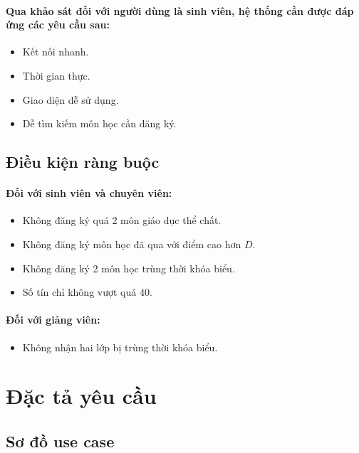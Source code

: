 \documentclass{article}
\begin{document}
    \paragraph{
      \textnormal{
        Qua khảo sát đối với người dùng là sinh viên, hệ thống cần được đáp ứng các yêu cầu sau:
      }
    }
    \begin{itemize}
      \item Kết nối nhanh.
      \item Thời gian thực.
      \item Giao diện dễ sử dụng.
      \item Dễ tìm kiếm môn học cần đăng ký.
    \end{itemize}
  
  \subsection{Điều kiện ràng buộc}
    \paragraph{Đối với sinh viên và chuyên viên:}
    \begin{itemize}
      \item Không đăng ký quá 2 môn giáo dục thể chất.
      \item Không đăng ký môn học đã qua với điểm cao hơn $ D $.
      \item Không đăng ký 2 môn học trùng thời khóa biểu.
      \item Số tín chỉ không vượt quá $ 40 $.
    \end{itemize}

    \paragraph{Đối với giảng viên:}
    \begin{itemize}
      \item Không nhận hai lớp bị trùng thời khóa biểu.
    \end{itemize}

\section{Đặc tả yêu cầu}

  \subsection{Sơ đồ use case}
\end{document}
